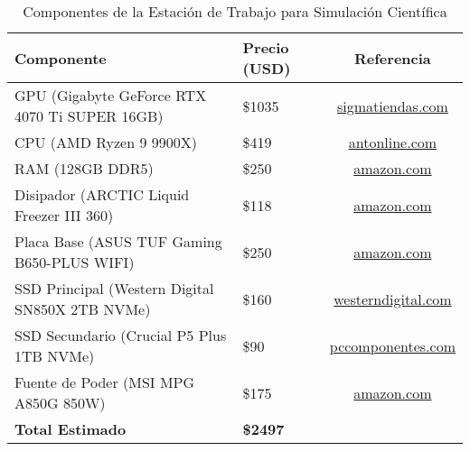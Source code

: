 \documentclass{article}
\begin{document}
\begin{table}[h!]
    \centering
    \caption{Componentes de la Estación de Trabajo para Simulación Científica}
    \label{tab:pc_components}
    \begin{tabular}{llc}
        \toprule
        \textbf{Componente} & \textbf{Precio (USD)} & \textbf{Referencia} \\
        \midrule
        GPU (Gigabyte GeForce RTX 4070 Ti SUPER 16GB) & \$1035 & \href{https://www.sigmatiendas.com}{sigmatiendas.com} \\
        CPU (AMD Ryzen 9 9900X) & \$419 & \href{https://www.antonline.com}{antonline.com} \\
        RAM (128GB DDR5) & \$250 & \href{https://www.amazon.com}{amazon.com} \\
        Disipador (ARCTIC Liquid Freezer III 360) & \$118 & \href{https://www.amazon.com}{amazon.com} \\
        Placa Base (ASUS TUF Gaming B650-PLUS WIFI) & \$250 & \href{https://www.amazon.com}{amazon.com} \\
        SSD Principal (Western Digital SN850X 2TB NVMe) & \$160 & \href{https://www.westerndigital.com}{westerndigital.com} \\
        SSD Secundario (Crucial P5 Plus 1TB NVMe) & \$90 & \href{https://www.pccomponentes.com}{pccomponentes.com} \\
        Fuente de Poder (MSI MPG A850G 850W) & \$175 & \href{https://www.amazon.com}{amazon.com} \\
        \midrule
        \textbf{Total Estimado} & \textbf{\$2497} & \\
        \bottomrule
    \end{tabular}
\end{table}
\end{document}

